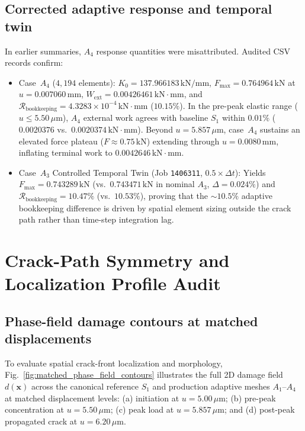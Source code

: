 \subsection{Corrected adaptive response and temporal twin}
In earlier summaries, $A_4$ response quantities were misattributed. Audited CSV records confirm:
\begin{itemize}
  \item Case~$A_4$ ($4{,}194$ elements): $K_0 = 137.966183\,\mathrm{kN/mm}$, $F_{\max} = 0.764964\,\mathrm{kN}$ at $u = 0.007060\,\mathrm{mm}$, $W_{\mathrm{ext}} = 0.00426461\,\mathrm{kN\cdot mm}$, and $\mathcal{R}_{\mathrm{bookkeeping}} = 4.3283\times 10^{-4}\,\mathrm{kN\cdot mm}$ ($10.15\%$). In the pre-peak elastic range ($u \le 5.50\,\mu\mathrm{m}$), $A_4$ external work agrees with baseline $S_1$ within $0.01\%$ ($0.0020376$ vs.\ $0.0020374\,\mathrm{kN\cdot mm}$). Beyond $u = 5.857\,\mu\mathrm{m}$, case~$A_4$ sustains an elevated force plateau ($F \approx 0.75\,\mathrm{kN}$) extending through $u = 0.0080\,\mathrm{mm}$, inflating terminal work to $0.0042646\,\mathrm{kN\cdot mm}$.
  \item Case~$A_3$ Controlled Temporal Twin (Job \texttt{1406311}, $0.5\times\Delta t$): Yields $F_{\max} = 0.743289\,\mathrm{kN}$ (vs.\ $0.743471\,\mathrm{kN}$ in nominal $A_3$, $\Delta = 0.024\%$) and $\mathcal{R}_{\mathrm{bookkeeping}} = 10.47\%$ (vs.\ $10.53\%$), proving that the $\sim 10.5\%$ adaptive bookkeeping difference is driven by spatial element sizing outside the crack path rather than time-step integration lag.
\end{itemize}

\section{Crack-Path Symmetry and Localization Profile Audit}
\label{sec:crack_path}

\subsection{Phase-field damage contours at matched displacements}
To evaluate spatial crack-front localization and morphology, Fig.~\ref{fig:matched_phase_field_contours} illustrates the full 2D damage field $d(\mathbf{x})$ across the canonical reference $S_1$ and production adaptive meshes $A_1$--$A_4$ at matched displacement levels: (a) initiation at $u = 5.00\,\mu\mathrm{m}$; (b) pre-peak concentration at $u = 5.50\,\mu\mathrm{m}$; (c) peak load at $u = 5.857\,\mu\mathrm{m}$; and (d) post-peak propagated crack at $u = 6.20\,\mu\mathrm{m}$.

